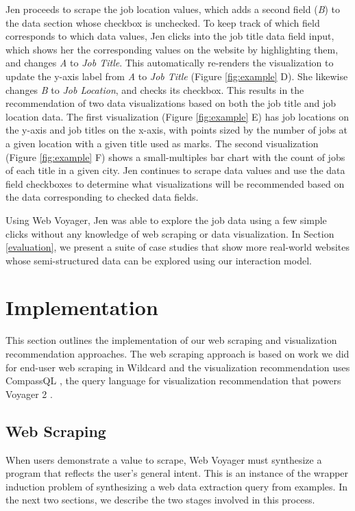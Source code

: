 \documentclass{vgtc}                          %
\begin{document}
Jen proceeds to scrape the job location values, which adds a second field (\emph{B}) to the data section whose checkbox is unchecked. To keep track of which
field corresponds to which data values, Jen clicks into the job title data field input, which shows her the corresponding values on the website by highlighting
them, and changes \emph{A} to \emph{Job Title}. This automatically re-renders the visualization to update the y-axis label from \emph{A} to \emph{Job Title}
(Figure \ref{fig:example} D). She likewise changes \emph{B} to \emph{Job Location}, and checks its checkbox. This results in the recommendation of two data
visualizations based on both the job title and job location data. The first visualization (Figure \ref{fig:example} E) has job locations on the y-axis and
job titles on the x-axis, with points sized by the number of jobs at a given location with a given title used as marks. The second visualization
(Figure \ref{fig:example} F) shows a small-multiples bar chart with the count of jobs of each title in a given city. Jen continues to scrape data
values and use the data field checkboxes to determine what visualizations will be recommended based on the data corresponding to checked data fields. 

Using Web Voyager, Jen was able to explore the job data using a few simple clicks without any knowledge of web scraping or data visualization.
In Section \ref{evaluation}, we present a suite of case studies that show more real-world websites whose semi-structured data can be explored
using our interaction model.

\section{Implementation} \label{implementation}

This section outlines the implementation of our web scraping and visualization recommendation approaches. The web scraping approach is based on work we did for end-user web scraping in Wildcard \cite{litt2020} and the visualization recommendation uses CompassQL \cite{wongsuphasawat2016}, the query language for visualization recommendation that powers Voyager 2 \cite{wongsuphasawat2017}.

\subsection{Web Scraping}

When users demonstrate a value to scrape, Web Voyager must synthesize a program that reflects the user’s general intent. This is an instance of the wrapper induction \cite{kushmerick2000} problem of synthesizing a web data extraction query from examples. In the next two sections, we describe the two stages involved in this process.
\end{document}
